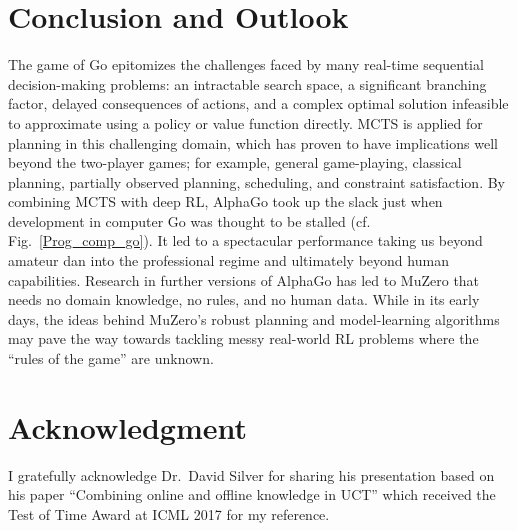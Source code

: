 \documentclass[conference]{IEEEtran}
\begin{document}
\section{Conclusion and Outlook}
The game of Go epitomizes the challenges faced by many real-time sequential decision-making problems: an intractable search space, a significant branching factor, delayed consequences of actions, and a complex optimal solution infeasible to approximate using a policy or value function directly. MCTS is applied for planning in this challenging domain, which has proven to have implications well beyond the two-player games; for example, general game-playing, classical planning, partially observed planning, scheduling, and constraint satisfaction\cite{b11}. By combining MCTS with deep RL, AlphaGo took up the slack just when development in computer Go was thought to be stalled (cf. Fig.~\ref{Prog_comp_go}). It led to a spectacular performance taking us beyond amateur dan into the professional regime and ultimately beyond human capabilities. Research in further versions of AlphaGo has led to MuZero that needs no domain knowledge, no rules, and no human data. While in its early days, the ideas behind MuZero's robust planning and model-learning algorithms may pave the way towards tackling messy real-world RL problems where the “rules of the game” are unknown. 


\section*{Acknowledgment}
I gratefully acknowledge Dr.\ David Silver for sharing his presentation based on his paper ``Combining online and offline knowledge in UCT'' which received the Test of Time Award at ICML 2017 for my reference.
\end{document}
